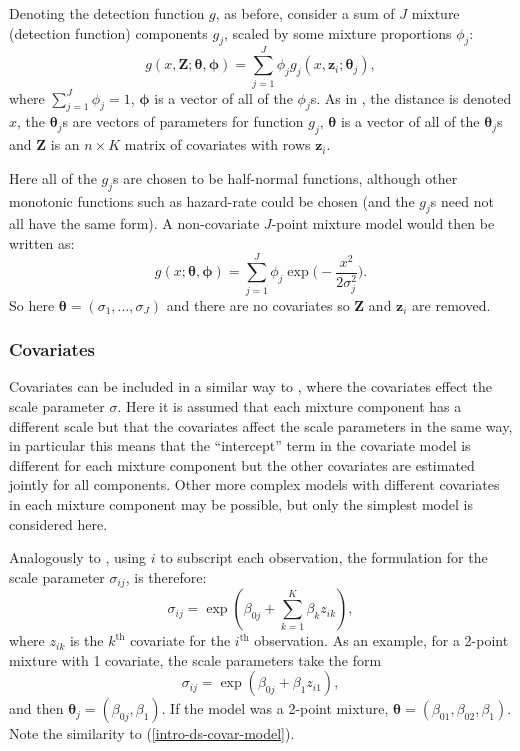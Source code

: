 Denoting the detection function $g$, as before, consider a sum of $J$ mixture (detection function) components $g_j$, scaled by some mixture proportions $\phi_j$:
\begin{equation}
g(x,\mathbf{Z}; \bm{\theta}, \bm{\phi}) = \sum_{j=1}^J \phi_j g_j(x,\mathbf{z}_i; \bm{\theta}_j),
\label{mix-detfct}
\end{equation}
where $\sum_{j=1}^J \phi_j = 1$, $\bm{\phi}$ is a vector of all of the $\phi_j$s. As in , the distance is denoted $x$, the $\bm{\theta}_j$s are vectors of parameters for function $g_j$, $\bm{\theta}$ is a vector of all of the $\bm{\theta}_j$s and $\mathbf{Z}$ is an $n\times K$ matrix of covariates with rows $\mathbf{z}_i$.

Here all of the $g_j$s are chosen to be half-normal functions, although other monotonic functions such as hazard-rate could be chosen (and the $g_j$s need not all have the same form). A non-covariate $J$-point mixture model would then be written as:
\begin{equation*}
g(x; \bm{\theta}, \bm{\phi}) = \sum_{j=1}^J \phi_j \exp \Big( - \frac{x^2}{2\sigma_j^2} \Big).
\end{equation*}
So here $\bm{\theta} = (\sigma_1, \ldots, \sigma_J)$ and there are no covariates so $\mathbf{Z}$ and $\mathbf{z}_i$ are removed.

\subsubsection{Covariates}

Covariates can be included in a similar way to \cite[Chapter 3]{ADS}, where the covariates effect the scale parameter $\sigma$. Here it is assumed that each mixture component has a different scale but that the covariates affect the scale parameters in the same way, in particular this means that the ``intercept'' term in the covariate model is different for each mixture component but the other covariates are estimated jointly for all components. Other more complex models with different covariates in each mixture component may be possible, but only the simplest model is considered here.

Analogously to , using $i$ to subscript each observation, the formulation for the scale parameter $\sigma_{ij}$, is therefore:
\begin{equation*}
\sigma_{ij} = \exp( \beta_{0j} + \sum_{k=1}^K \beta_k z_{ik}),
\end{equation*}
where $z_{ik}$ is the $k^\text{th}$ covariate for the $i^\text{th}$ observation. As an example, for a 2-point mixture with 1 covariate, the scale parameters take the form
\begin{equation*}
\sigma_{ij} = \exp( \beta_{0j} + \beta_1 z_{i1}),
\end{equation*}
and then $\bm{\theta}_j = (\beta_{0j}, \beta_1)$. If the model was a 2-point mixture, $\bm{\theta} = (\beta_{01}, \beta_{02}, \beta_1)$. Note the similarity to (\ref{intro-ds-covar-model}).

